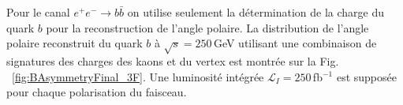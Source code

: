 Pour le canal $e^+e^-\to b\bar{b}$ on utilise seulement la détermination de la charge du quark $b$ pour la reconstruction de l'angle polaire.
La distribution de l'angle polaire reconstruit du quark $b$ à $\sqrt{s} = 250$\,GeV utilisant une combinaison de signatures des charges des kaons et du vertex est montrée sur la Fig. ~\ref{fig:BAsymmetryFinal_3F}. 
Une luminosité intégrée $\mathcal{L}_I=250$\,fb$^{-1}$ est supposée pour chaque polarisation du faisceau.



